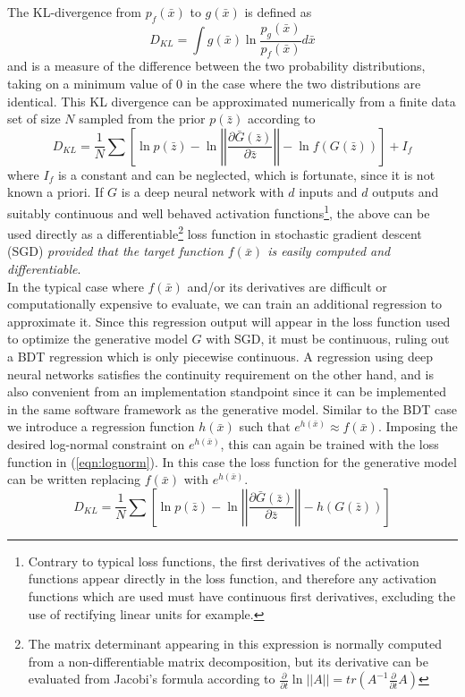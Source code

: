 \documentclass[a4paper,11pt]{article}
\begin{document}
The KL-divergence\cite{kl} from $p_f(\bar x)$ to $g(\bar x)$ is defined as
\begin{equation}
 D_{KL} = \int g(\bar x)\ln\frac{p_g(\bar x)}{p_f(\bar x)}d\bar x
\end{equation}
and is a measure of the difference between the two probability distributions, taking on a minimum value of $0$ in the case where the two distributions are identical.  This KL divergence can be approximated numerically from a finite data set of size $N$ sampled from the prior $p(\bar z)$ according to
  \begin{equation}
  D_{KL} = \frac{1}{N}\sum \left[\ln p(\bar z) - \ln\left|\left|\frac{\partial \bar G(\bar z)}{\partial\bar z}\right|\right| - \ln f(G(\bar z)) \right] + I_f
  \label{eqn:directloss}
  \end{equation}
where $I_f$ is a constant and can be neglected, which is fortunate, since it is not known a priori.  If $G$ is a deep neural network with $d$ inputs and $d$ outputs and suitably continuous and well behaved activation functions\footnote{Contrary to typical loss functions, the first derivatives of the activation functions appear directly in the loss function, and therefore any activation functions which are used must have continuous first derivatives, excluding the use of rectifying linear units for example.}, the above can be used directly as a differentiable\footnote{The matrix determinant appearing in this expression is normally computed from a non-differentiable matrix decomposition, but its derivative can be evaluated from Jacobi's formula according to $\frac{\partial}{\partial t}\ln\left|\left|A\right|\right| = tr\left(A^{-1}\frac{\partial}{\partial t}A\right)$} loss function in stochastic gradient descent (SGD) \textit{provided that the target function $f(\bar x)$ is easily computed and differentiable}.\\

In the typical case where $f(\bar x)$ and/or its derivatives are difficult or computationally expensive to evaluate, we can train an additional regression to approximate it.  Since this regression output will appear in the loss function used to optimize the generative model $G$ with SGD, it must be continuous, ruling out a BDT regression which is only piecewise continuous.  A regression using deep neural networks satisfies the continuity requirement on the other hand, and is also convenient from an implementation standpoint since it can be implemented in the same software framework as the generative model.  Similar to the BDT case we introduce a regression function $h(\bar x)$ such that $e^{h(\bar x)} \approx f(\bar x)$.  Imposing the desired log-normal constraint on $e^{h(\bar x)}$, this can again be trained with the loss function in (\ref{eqn:lognorm}).  In this case the loss function for the generative model can be written replacing $f(\bar x)$ with $e^{h(\bar x)}$.
  \begin{equation}
  D_{KL} = \frac{1}{N}\sum\left[\ln p(\bar z) - \ln\left|\left|\frac{\partial \bar G(\bar z)}{\partial\bar z}\right|\right| - h(G(\bar z)) \right]
  \end{equation}
\end{document}
